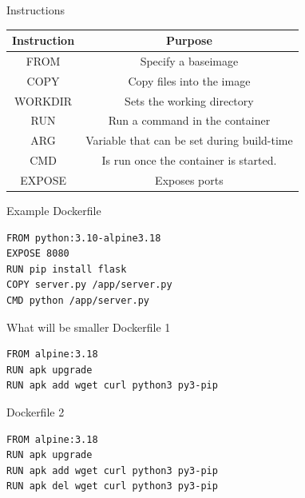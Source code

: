 \documentclass[12pt]{beamer}
\begin{document}
\begin{frame}{Instructions}
    \begin{table}[]
        \begin{tabular}{|c|c|}
            \hline
            Instruction & Purpose                                    \\ \hline
            FROM        & Specify a baseimage                        \\ \hline
            COPY        & Copy files into the image                  \\ \hline
            WORKDIR    & Sets the working directory                 \\ \hline
            RUN         & Run a command in the container             \\ \hline
            ARG         & Variable that can be set during build-time \\ \hline
            CMD         & Is run once the container is started.      \\ \hline
            EXPOSE      & Exposes ports                              \\ \hline
        \end{tabular}
    \end{table} 
\end{frame}

\begin{frame}[fragile]{Example Dockerfile}
   \begin{lstlisting}[language=docker]
FROM python:3.10-alpine3.18
EXPOSE 8080
RUN pip install flask 
COPY server.py /app/server.py
CMD python /app/server.py
    \end{lstlisting} 
\end{frame}


\begin{frame}[fragile]{What will be smaller}
    Dockerfile 1
   \begin{lstlisting}[language=docker]
FROM alpine:3.18
RUN apk upgrade
RUN apk add wget curl python3 py3-pip
    \end{lstlisting}
    Dockerfile 2
   \begin{lstlisting}[language=docker]
FROM alpine:3.18
RUN apk upgrade
RUN apk add wget curl python3 py3-pip
RUN apk del wget curl python3 py3-pip
    \end{lstlisting}
\end{frame}
\end{document}
